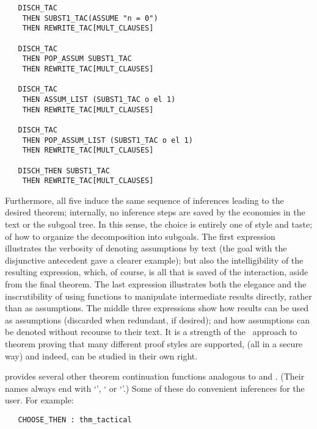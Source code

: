 \begin{hol}
\begin{verbatim}
   DISCH_TAC
    THEN SUBST1_TAC(ASSUME "n = 0")
    THEN REWRITE_TAC[MULT_CLAUSES]

   DISCH_TAC
    THEN POP_ASSUM SUBST1_TAC
    THEN REWRITE_TAC[MULT_CLAUSES]

   DISCH_TAC
    THEN ASSUM_LIST (SUBST1_TAC o el 1)
    THEN REWRITE_TAC[MULT_CLAUSES]

   DISCH_TAC
    THEN POP_ASSUM_LIST (SUBST1_TAC o el 1)
    THEN REWRITE_TAC[MULT_CLAUSES]

   DISCH_THEN SUBST1_TAC
    THEN REWRITE_TAC[MULT_CLAUSES]
\end{verbatim}\end{hol}

\noindent Furthermore, all five induce the
same sequence of inferences leading to
the desired theorem; internally, no inference steps are saved by the
economies in the \ML{} text or the subgoal tree.  In this sense,
the choice is entirely one of style and taste;
of how to organize the decomposition into subgoals.
The first expression illustrates the verbosity of denoting
assumptions by text (the goal with the
disjunctive antecedent gave a clearer
example); but also
the intelligibility of the resulting expression, which, of course, is all
that is saved of the interaction, aside from the final theorem.
The last expression
illustrates both the elegance and the inscrutibility of
using functions to manipulate intermediate results directly, rather than
as assumptions.
The middle three expressions
show how results can be used as assumptions (discarded when
redundant, if desired); and how
assumptions can be denoted without
recourse to their text.
It is a strength of the \LCF\ approach
 to
theorem proving that many different proof styles are supported,
(all in a secure way) and indeed, can be studied in their own
right.

\HOL{} provides several other theorem continuation functions analogous to
 and .
(Their names always end with
`', ` or `'.)
Some of these do convenient inferences for the user.
For example:

\begin{holboxed}\begin{verbatim}
   CHOOSE_THEN : thm_tactical
\end{verbatim}\end{holboxed}

